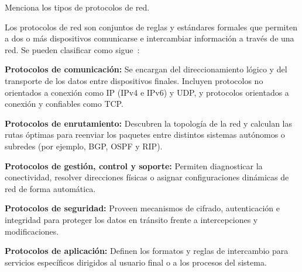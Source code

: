 Menciona los tipos de protocolos de red.

Los protocolos de red son conjuntos de reglas y estándares formales que permiten a dos o más dispositivos comunicarse e intercambiar información a través de una red. Se pueden clasificar como sigue~\cite{tanenbaum_redes}:
\begin{itemizeColor}
    \item \textbf{Protocolos de comunicación:} Se encargan del direccionamiento lógico y del transporte de los datos entre dispositivos finales. Incluyen protocolos no orientados a conexión como IP (IPv4 e IPv6) y UDP, y protocolos orientados a conexión y confiables como TCP.
    \item \textbf{Protocolos de enrutamiento:} Descubren la topología de la red y calculan las rutas óptimas para reenviar los paquetes entre distintos sistemas autónomos o subredes (por ejemplo, BGP, OSPF y RIP).
    \item \textbf{Protocolos de gestión, control y soporte:} Permiten diagnosticar la conectividad, resolver direcciones físicas o asignar configuraciones dinámicas de red de forma automática. 
    \item \textbf{Protocolos de seguridad:} Proveen mecanismos de cifrado, autenticación e integridad para proteger los datos en tránsito frente a intercepciones y modificaciones.
    \item \textbf{Protocolos de aplicación:} Definen los formatos y reglas de intercambio para servicios específicos dirigidos al usuario final o a los procesos del sistema.
\end{itemizeColor}

